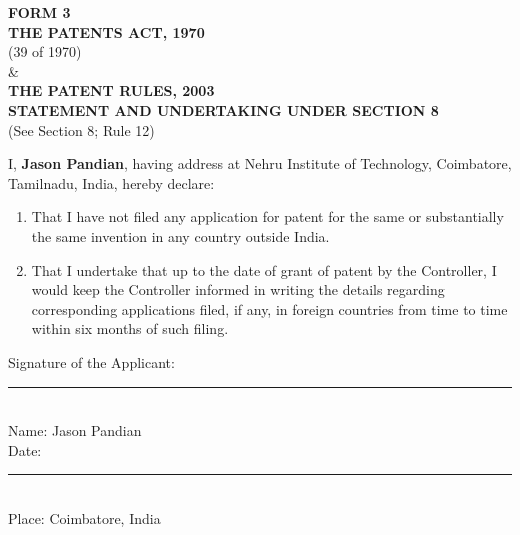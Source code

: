 \documentclass[12pt,a4paper]{article}
\begin{document}
\begin{center}
    \textbf{\large FORM 3} \\
    \vspace{0.2cm}
    \textbf{THE PATENTS ACT, 1970} \\
    (39 of 1970) \\
    \& \\
    \textbf{THE PATENT RULES, 2003} \\
    \vspace{0.4cm}
    \textbf{\large STATEMENT AND UNDERTAKING UNDER SECTION 8} \\
    (See Section 8; Rule 12) \\
\end{center}

\vspace{1cm}

\noindent I, \textbf{Jason Pandian}, having address at Nehru Institute of Technology, Coimbatore, Tamilnadu, India, hereby declare:

\begin{enumerate}
    \item That I have not filed any application for patent for the same or substantially the same invention in any country outside India.
    
    \item That I undertake that up to the date of grant of patent by the Controller, I would keep the Controller informed in writing the details regarding corresponding applications filed, if any, in foreign countries from time to time within six months of such filing.
\end{enumerate}

\vspace{2cm}

\noindent Signature of the Applicant: \rule{5cm}{0.4pt} \\
Name: Jason Pandian \\
Date: \rule{5cm}{0.4pt} \\
Place: Coimbatore, India
\end{document}
